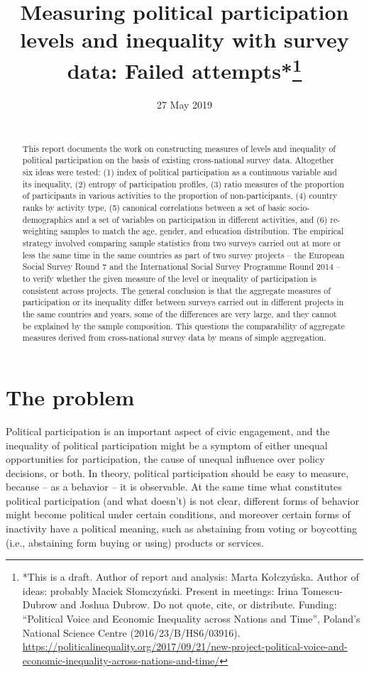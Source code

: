 \documentclass[12pt,]{article}
\title{\vspace{1cm}Measuring political participation levels and inequality with survey data: Failed attempts*\footnote{*This is a draft. Author of report and analysis: Marta Kołczyńska. Author of ideas: probably Maciek Słomczyński. Present in meetings: Irina Tomescu-Dubrow and Joshua Dubrow. Do not quote, cite, or distribute. Funding: ``Political Voice and Economic Inequality across Nations and Time'', Poland's National Science Centre (2016/23/B/HS6/03916). \url{https://politicalinequality.org/2017/09/21/new-project-political-voice-and-economic-inequality-across-nations-and-time/}}\vspace{0.5cm}\\}
\author{}
\date{27 May 2019\\
~\\}
\begin{document}
\maketitle
\begin{abstract}
\noindent{}This report documents the work on constructing measures of levels and inequality of political participation on the basis of existing cross-national survey data. Altogether six ideas were tested: (1) index of political participation as a continuous variable and its inequality, (2) entropy of participation profiles, (3) ratio measures of the proportion of participants in various activities to the proportion of non-participants, (4) country ranks by activity type, (5) canonical correlations between a set of basic socio-demographics and a set of variables on participation in different activities, and (6) re-weighting samples to match the age, gender, and education distribution. The empirical strategy involved comparing sample statistics from two surveys carried out at more or less the same time in the same countries as part of two survey projects -- the European Social Survey Round 7 and the International Social Survey Programme Round 2014 -- to verify whether the given measure of the level or inequality of participation is consistent across projects. The general conclusion is that the aggregate measures of participation or its inequality differ between surveys carried out in different projects in the same countries and years, some of the differences are very large, and they cannot be explained by the sample composition. This questions the comparability of aggregate measures derived from cross-national survey data by means of simple aggregation. \vspace{.8cm}
\end{abstract}

\clearpage

\renewcommand{\baselinestretch}{0.5}\normalsize
\tableofcontents
\renewcommand{\baselinestretch}{1.1}\normalsize

\clearpage

\hypertarget{the-problem}{%
\section{The problem}\label{the-problem}}

Political participation is an important aspect of civic engagement, and the inequality of political participation might be a symptom of either unequal opportunities for participation, the cause of unequal influence over policy decisions, or both. In theory, political participation should be easy to measure, because -- as a behavior -- it is observable. At the same time what constitutes political participation (and what doesn't) is not clear, different forms of behavior might become political under certain conditions, and moreover certain forms of inactivity have a political meaning, such as abstaining from voting or boycotting (i.e., abstaining form buying or using) products or services.
\end{document}
